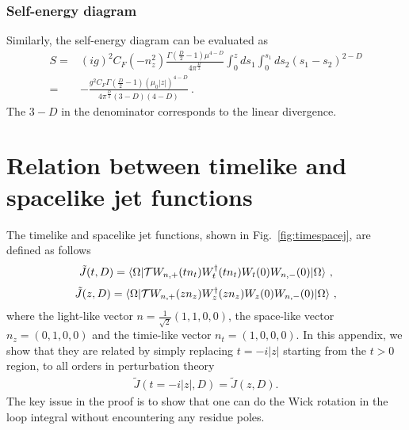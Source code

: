 \documentclass[a4paper,11pt]{article}
\begin{document}
\subsubsection{Self-energy diagram}
Similarly, the self-energy diagram can be evaluated as
\begin{align}
S=&(ig)^2C_F(-n_z^2)\frac{\Gamma(\frac{D}{2}-1)\mu^{4-D}}{4\pi^{\frac{D}{2}}}\int_{0}^z ds_1 \int_{0}^{s_1} ds_2 (s_1-s_2)^{2-D} \nonumber \\ 
=&-\frac{g^2C_F \Gamma (\frac{D}{2}-1)(\mu_0 |z|)^{4-D}}{4\pi^{\frac{D}{2}}(3-D)(4-D)} \ .
\end{align}
The $3-D$ in the denominator corresponds to the linear divergence.


\section{Relation between timelike and spacelike jet functions}\label{sec:relation}
The timelike and spacelike jet functions, shown in Fig.~\ref{fig:timespacej}, are defined as follows
\begin{align}
\tilde J(t,D)=\langle \Omega|{\cal T}W_{n,+}(t n_t)W_t^{\dagger}(t n_t)W_t(0)W_{n,-}(0)|\Omega\rangle \ ,
\end{align}
\begin{align}
\tilde J(z,D)=\langle \Omega|{\cal T}W_{n,+}(zn_z)W_z^{\dagger}(zn_z)W_z(0)W_{n,-}(0)|\Omega\rangle \ , 
\end{align}
where the light-like vector $n=\frac{1}{\sqrt{2}}(1,1,0,0)$, the space-like vector $n_z=(0,1,0,0)$ and the timie-like vector $n_t=(1,0,0,0)$.
In this appendix, we show that they are related by simply replacing $t=-i |z|$ starting from the $t>0$ region, to all orders in perturbation theory
\begin{align}
\tilde J(t = -i |z|,D) = \tilde J(z,D).
\end{align}
The key issue in the proof is to show that one can do the Wick rotation in the loop integral without encountering any residue poles. 
\end{document}
